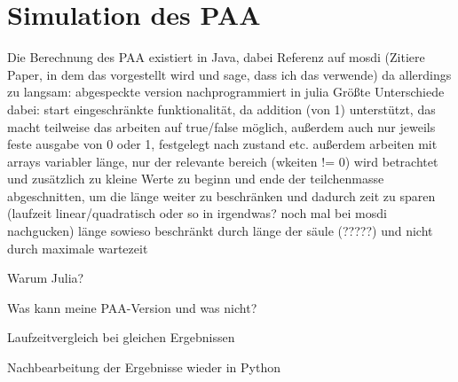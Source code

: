 \section{Simulation des PAA}
Die Berechnung des PAA existiert in Java, dabei Referenz auf mosdi (Zitiere Paper, in dem das vorgestellt wird und sage, dass ich das verwende)
da allerdings zu langsam: abgespeckte version nachprogrammiert in julia
Größte Unterschiede dabei: start eingeschränkte funktionalität, da addition (von 1) unterstützt, das macht teilweise das arbeiten auf true/false möglich, außerdem auch nur jeweils feste ausgabe von 0 oder 1, festgelegt nach zustand etc.
außerdem arbeiten mit arrays variabler länge, nur der relevante bereich (wkeiten != 0) wird betrachtet und zusätzlich zu kleine Werte zu beginn und ende der teilchenmasse abgeschnitten, um die länge weiter zu beschränken und dadurch zeit zu sparen (laufzeit linear/quadratisch oder so in irgendwas? noch mal bei mosdi nachgucken) länge sowieso beschränkt durch länge der säule (?????) und nicht durch maximale wartezeit

Warum Julia? 

Was kann meine PAA-Version und was nicht?

Laufzeitvergleich bei gleichen Ergebnissen

Nachbearbeitung der Ergebnisse wieder in Python




